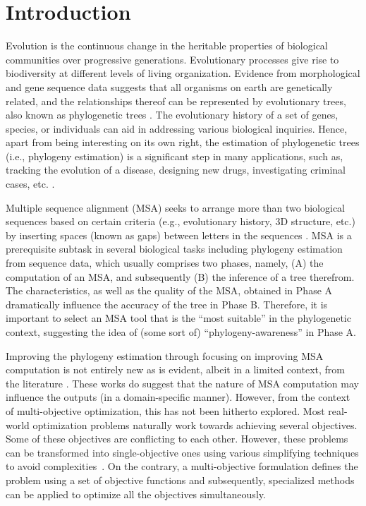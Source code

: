 \chapter{Introduction}
\label{ch:introduction}
Evolution is the continuous change in the heritable properties of biological communities over progressive generations. Evolutionary processes give rise to biodiversity at different levels of living organization. 
Evidence from morphological and gene sequence data suggests that all organisms on earth are genetically related, and the relationships thereof can be represented by evolutionary trees, also known as phylogenetic trees \cite{warnow2017computational}. The evolutionary history of a set of genes, species, or individuals can aid in addressing various biological inquiries. Hence, apart from being interesting on its own right, the estimation of phylogenetic trees (i.e., phylogeny estimation) is a significant step in many applications, such as, tracking the evolution of a disease, designing new drugs, investigating criminal cases, etc. \cite{bush1999predicting, aluru2005handbook}. 

Multiple sequence alignment (MSA) seeks to arrange more than two biological sequences based on certain criteria (e.g., evolutionary history, 3D structure, etc.) by inserting spaces (known as gaps) between letters in the sequences \cite{warnow2017computational}. MSA is a prerequisite subtask in several biological tasks including phylogeny estimation from sequence data, which usually comprises two phases, namely, (A) the computation of an MSA, and subsequently (B) the inference of a tree therefrom. The characteristics, as well as the quality of the MSA, obtained in Phase A dramatically influence the accuracy of the tree in Phase B. Therefore, it is important to select an MSA tool that is the “most suitable” in the phylogenetic context, suggesting the idea of (some sort of) “phylogeny-awareness” in Phase A. 

Improving the phylogeny estimation through focusing on improving MSA computation is not entirely new as is evident, albeit in a limited context, from the literature \cite{redelings2005joint, ashkenazy2018multiple, warnow2013large}. These works do suggest that the nature of MSA computation may influence the outputs (in a domain-specific manner). However, from the context of multi-objective optimization, this has not been hitherto explored. Most real-world optimization problems naturally work towards achieving several objectives. Some of these objectives are conflicting to each other. However, these problems can be transformed into single-objective ones using various simplifying techniques to avoid complexities~\citep{kalyanmoy2001multi}. On the contrary, a multi-objective formulation defines the problem using a set of objective functions and subsequently, specialized methods can be applied to optimize all the objectives simultaneously.

